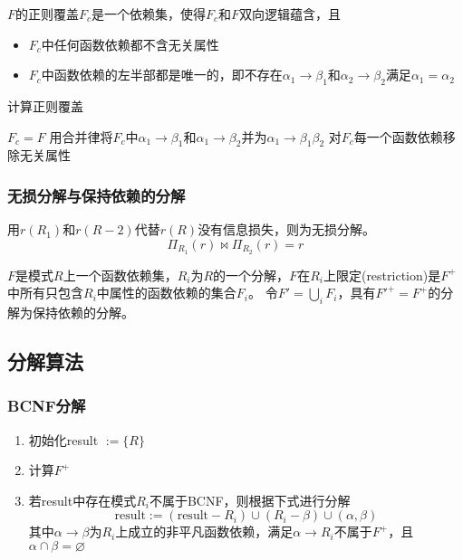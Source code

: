 \begin{definition}
$F$的正则覆盖$F_c$是一个依赖集，使得$F_c$和$F$双向逻辑蕴含，且
\begin{itemize}
	\item $F_c$中任何函数依赖都不含无关属性
	\item $F_c$中函数依赖的左半部都是唯一的，即不存在$\alpha_1\to\beta_1$和$\alpha_2\to\beta_2$满足$\alpha_1=\alpha_2$
\end{itemize}
\end{definition}
\begin{algorithm}
\caption{计算正则覆盖}
\begin{algorithmic}[1]
\State $F_c=F$
\Repeat
\State 用合并律将$F_c$中$\alpha_1\to\beta_1$和$\alpha_1\to\beta_2$并为$\alpha_1\to\beta_1\beta_2$
\State 对$F_c$每一个函数依赖移除无关属性
\end{algorithmic}
\end{algorithm}

\subsubsection{无损分解与保持依赖的分解}
\begin{definition}[无损分解]
用$r(R_1)$和$r(R-2)$代替$r(R)$没有信息损失，则为无损分解。
\[\Pi_{R_1}(r)\Join\Pi_{R_2}(r)=r\]
\end{definition}

\begin{definition}[保持依赖的分解]
$F$是模式$R$上一个函数依赖集，$R_i$为$R$的一个分解，$F$在$R_i$上限定(restriction)是$F^+$中所有只包含$R_i$中属性的函数依赖的集合$F_i$。
令$F'=\bigcup_i F_i$，具有$F'^+=F^+$的分解为保持依赖的分解。
\end{definition}

\subsection{分解算法}
\subsubsection{BCNF分解}
\begin{enumerate}
	\item 初始化result $:=\{R\}$
	\item 计算$F^+$
	\item 若result中存在模式$R_i$不属于BCNF，则根据下式进行分解
	\[\text{result} := (\text{result}-R_i)\cup(R_i-\beta)\cup(\alpha,\beta)\]
	其中$\alpha\to\beta$为$R_i$上成立的非平凡函数依赖，满足$\alpha\to R_i$不属于$F^+$，且$\alpha\cap\beta=\varnothing$
\end{enumerate}

